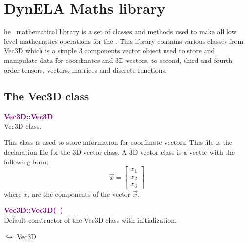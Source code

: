 %
%
%
\chapter{DynELA Maths library}

\startcontents[chapters]
\printmyminitoc[2]he \DynELA~mathematical library is a set of classes and methods used to make all low level mathematics operations for the \DynELA. This library contains various classes from Vec3D which is a simple 3 components vector object used to store and manipulate data for coordinates and 3D vectors, to second, third and fourth order tensors, vectors, matrices and discrete functions.

\section{The Vec3D class}

\textcolor{purple}{\textbf{Vec3D::Vec3D}}\label{Vec3D::Vec3D}\\
Vec3D class.

This class is used to store information for coordinate vectors.
This file is the declaration file for the 3D vector class.
A 3D vector class is a vector with the following form:
\begin{equation*}
\overrightarrow{x}=\left[\begin{array}{c}
  x_{1}\\
  x_{2}\\
  x_{3}
  \end{array}\right]
\end{equation*}
where $x_{i}$ are the components of the vector $\overrightarrow{x}$.

\textcolor{purple}{\textbf{Vec3D::Vec3D(~)}}\label{Vec3D::Vec3D()}\\
Default constructor of the Vec3D class with initialization.\vspace*{-0.5em}
\begin{tcolorbox}[grow to left by=-1cm, width=\textwidth-1cm,myArgs,tabularx={l|R}]
$\hookrightarrow$ Vec3D
\end{tcolorbox}

